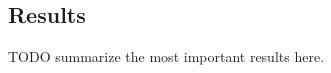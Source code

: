 \subsection{Results} \label{subsec:introduction-results}
TODO summarize the most important results here.






















